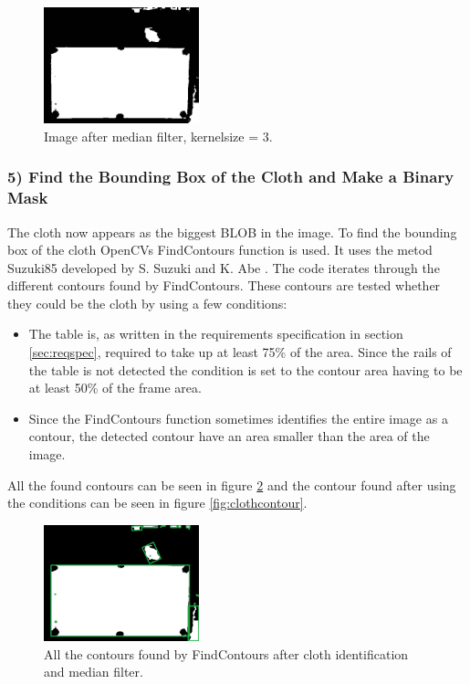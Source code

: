 \begin{figure}[H]
\begin{center}
\leavevmode
\includegraphics[width=0.4\textwidth]{images/afterclothmedian}
\end{center}
\caption{Image after median filter, kernelsize = 3.}
\label{fig:afterclothmedian}
\end{figure}

\subsubsection{5) Find the Bounding Box of the Cloth and Make a Binary Mask}
The cloth now appears as the biggest BLOB in the image. To find the bounding box of the cloth OpenCVs FindContours function is used. It uses the metod Suzuki85 developed by S. Suzuki and K. Abe \cite{contour}. The code iterates through the different contours found by FindContours. These contours are tested whether they could be the cloth by using a few conditions:

\begin{itemize}
	\item The table is, as written in the requirements specification in section \ref{sec:reqspec}, required to take up at least 75\% of the area. Since the rails of the table is not detected the condition is set to the contour area having to be at least 50\% of the frame area. 
	\item Since the FindContours function sometimes identifies the entire image as a contour, the detected contour have an area smaller than the area of the image.
\end{itemize}

All the found contours can be seen in figure \ref{fig:allcontours} and the contour found after using the conditions can be seen in figure \ref{fig:clothcontour}.
\begin{figure}[H]
\begin{center}
\leavevmode
\includegraphics[width=0.4\textwidth]{images/allcontours}
\end{center}
\caption{All the contours found by FindContours after cloth identification and median filter.}
\label{fig:allcontours}
\end{figure}

